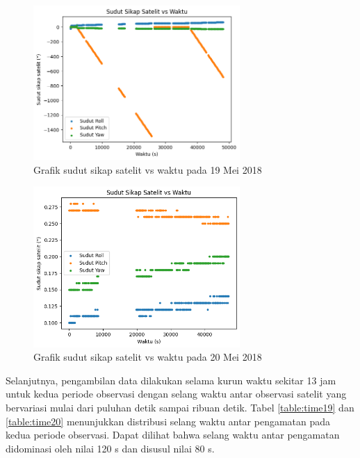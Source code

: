 \begin{figure}[H]
\setlength{}
\begin{center}
\includegraphics[width=0.7\textwidth]{fig/raw_angle_2018-05-19.png}
	\caption{Grafik sudut sikap satelit vs waktu pada 19 Mei 2018}
\label{fig:rawangle19}
\end{center}
\end{figure}

\begin{figure}[H]
\setlength{}
\begin{center}
\includegraphics[width=0.7\textwidth]{fig/raw_angle_2018-05-20.png}
	\caption{Grafik sudut sikap satelit vs waktu pada 20 Mei 2018}
\label{fig:rawangle20}
\end{center}
\end{figure}

Selanjutnya, pengambilan data dilakukan selama kurun waktu sekitar 13 jam untuk
kedua periode observasi dengan selang waktu antar observasi satelit yang
bervariasi mulai dari puluhan detik sampai ribuan detik. Tabel
\ref{table:time19} dan \ref{table:time20} menunjukkan distribusi selang waktu
antar pengamatan pada kedua periode observasi. Dapat dilihat bahwa selang waktu
antar pengamatan didominasi oleh nilai 120 s dan disusul nilai 80 s.

